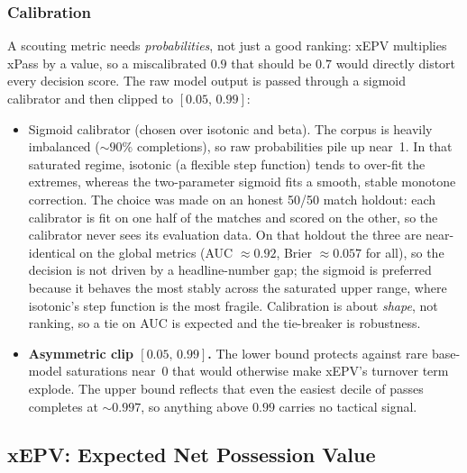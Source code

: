 \documentclass[12pt,a4paper]{article}
\begin{document}
\subsubsection{Calibration}\label{sec:calibration}

A scouting metric needs \emph{probabilities}, not just a good ranking: xEPV multiplies xPass by a value, so a miscalibrated $0.9$ that should be $0.7$ would directly distort every decision score.
The raw model output is passed through a sigmoid calibrator and then clipped to $[0.05,\,0.99]$:
\begin{itemize}
    \item Sigmoid calibrator (chosen over isotonic and beta). The corpus is heavily imbalanced (${\sim}90\%$ completions), so raw probabilities pile up near~1. In that saturated regime, isotonic (a flexible step function) tends to over-fit the extremes, whereas the two-parameter sigmoid fits a smooth, stable monotone correction. The choice was made on an honest 50/50 match holdout: each calibrator is fit on one half of the matches and scored on the other, so the calibrator never sees its evaluation data. On that holdout the three are near-identical on the global metrics (AUC $\approx 0.92$, Brier $\approx 0.057$ for all), so the decision is not driven by a headline-number gap; the sigmoid is preferred because it behaves the most stably across the saturated upper range, where isotonic's step function is the most fragile. Calibration is about \emph{shape}, not ranking, so a tie on AUC is expected and the tie-breaker is robustness.
    \item \textbf{Asymmetric clip $[0.05,\,0.99]$.} The lower bound protects against rare base-model saturations near~0 that would otherwise make xEPV's turnover term explode. The upper bound reflects that even the easiest decile of passes completes at ${\sim}0.997$, so anything above $0.99$ carries no tactical signal.
\end{itemize}

\subsection{xEPV: Expected Net Possession Value}\label{sec:xepv}
\end{document}
